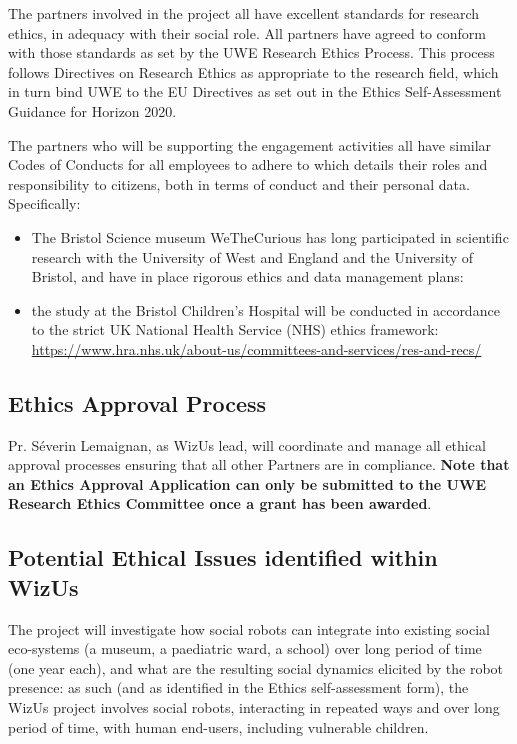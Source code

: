 \documentclass[11pt,a4paper]{report}
\newcommand{\project}{WizUs\xspace}
\begin{document}
The partners involved in the project all have excellent standards for research
ethics, in adequacy with their social role.  All partners have agreed to conform
with those standards as set by the UWE Research Ethics Process.  This process
follows Directives on Research Ethics as appropriate to the research field,
which in turn bind UWE to the EU Directives as set out in the Ethics
Self-Assessment Guidance for Horizon 2020.

The partners who will be supporting the engagement activities all have similar
Codes of Conducts for all employees to adhere to which details their roles and
responsibility to citizens, both in terms of conduct and their personal data.
Specifically:

\begin{itemize}
    \item The Bristol Science museum WeTheCurious has long participated in
        scientific research with the University of West and England and the
        University of Bristol, and have in place rigorous ethics and data
        management plans:
    \item the study at the Bristol Children's Hospital will be conducted in
        accordance to the strict UK National Health Service (NHS) ethics
        framework:
        \url{https://www.hra.nhs.uk/about-us/committees-and-services/res-and-recs/}
\end{itemize}



\subsection{Ethics Approval Process}

Pr. Séverin Lemaignan, as \project lead, will coordinate and manage all ethical
approval processes ensuring that all other Partners are in compliance. \textbf{Note that
an Ethics Approval Application can only be submitted to the UWE Research Ethics
Committee once a grant has been awarded}.

\subsection{Potential Ethical Issues identified within \project}

The project will investigate how social robots can integrate into existing
social eco-systems (a museum, a paediatric ward, a school) over long period of
time (one year each), and what are the resulting social dynamics elicited by the
robot presence: as such (and as identified in the Ethics self-assessment form),
the \project project involves social robots, interacting in repeated ways and
over long period of time, with human end-users, including vulnerable children.
\end{document}
